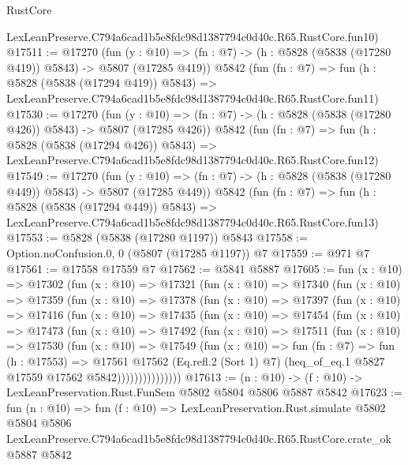 \begin{lexlean}{RustCore}
\begin{coremodule}
    LexLeanPreserve.C794a6cad1b5e8fdc98d1387794c0d40c.R65.RustCore.fun10)
@17511 := @17270
    (fun (y : @10) => (fn : @7) -> (h : @5828 (@5838 (@17280 @419)) @5843) -> @5807 (@17285 @419))
    @5842
    (fun (fn : @7) =>
    fun (h : @5828 (@5838 (@17294 @419)) @5843) =>
    LexLeanPreserve.C794a6cad1b5e8fdc98d1387794c0d40c.R65.RustCore.fun11)
@17530 := @17270
    (fun (y : @10) => (fn : @7) -> (h : @5828 (@5838 (@17280 @426)) @5843) -> @5807 (@17285 @426))
    @5842
    (fun (fn : @7) =>
    fun (h : @5828 (@5838 (@17294 @426)) @5843) =>
    LexLeanPreserve.C794a6cad1b5e8fdc98d1387794c0d40c.R65.RustCore.fun12)
@17549 := @17270
    (fun (y : @10) => (fn : @7) -> (h : @5828 (@5838 (@17280 @449)) @5843) -> @5807 (@17285 @449))
    @5842
    (fun (fn : @7) =>
    fun (h : @5828 (@5838 (@17294 @449)) @5843) =>
    LexLeanPreserve.C794a6cad1b5e8fdc98d1387794c0d40c.R65.RustCore.fun13)
@17553 := @5828 (@5838 (@17280 @1197)) @5843
@17558 := Option.noConfusion.{0, 0} (@5807 (@17285 @1197)) @7
@17559 := @971 @7
@17561 := @17558 @17559 @7
@17562 := @5841 @5887
@17605 := fun (x : @10) =>
  @17302
    (fun (x : @10) =>
    @17321
      (fun (x : @10) =>
      @17340
        (fun (x : @10) =>
        @17359
          (fun (x : @10) =>
          @17378
            (fun (x : @10) =>
            @17397
              (fun (x : @10) =>
              @17416
                (fun (x : @10) =>
                @17435
                  (fun (x : @10) =>
                  @17454
                    (fun (x : @10) =>
                    @17473
                      (fun (x : @10) =>
                      @17492
                        (fun (x : @10) =>
                        @17511
                          (fun (x : @10) =>
                          @17530
                            (fun (x : @10) =>
                            @17549
                              (fun (x : @10) =>
                              fun (fn : @7) =>
                              fun (h : @17553) =>
                              @17561
                                @17562
                                (Eq.refl.{2} (Sort 1) @7)
                                (heq_of_eq.{1} @5827 @17559 @17562 @5842)))))))))))))))
@17613 := (n : @10) -> (f : @10) -> LexLeanPreservation.Rust.FunSem @5802 @5804 @5806 @5887 @5842
@17623 := fun (n : @10) =>
  fun (f : @10) =>
  LexLeanPreservation.Rust.simulate
    @5802
    @5804
    @5806
    LexLeanPreserve.C794a6cad1b5e8fdc98d1387794c0d40c.R65.RustCore.crate_ok
    @5887
    @5842
\end{coremodule}
\end{lexlean}
